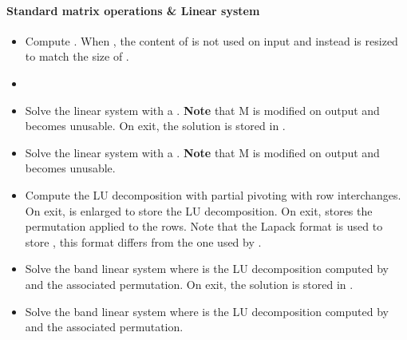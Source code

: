 \paragraph{Standard matrix operations \& Linear system}
\begin{itemize}
\item {} 
  \sshortdescribe Compute . When , the
  content of  is not used on input and instead  is resized to
  match the size of .
\item {}
  \sshortdescribe {}
\item 
    \sshortdescribe Solve the linear system  with  a .
  {\bf Note} that M is modified on output and becomes unusable. On exit, the
  solution  is stored in .
\item 
    \sshortdescribe Solve the linear system  with  a .
  {\bf Note} that M is modified on output and becomes unusable. 
\item {}
  \sshortdescribe Compute the LU decomposition with partial pivoting with row
  interchanges. On exit,  is enlarged to store the LU decomposition. On
  exit,  stores the permutation applied to the rows. Note that the Lapack format
  is used to store , this format differs from the one used by
  .
\item  {} 
  \sshortdescribe Solve the band linear system  where  is
  the LU decomposition computed by   and  the
  associated permutation. On exit, the solution  is stored in .
\item  {} 
  \sshortdescribe Solve the band linear system  where  is the LU
  decomposition computed by  and  the associated permutation. 
\end{itemize}

